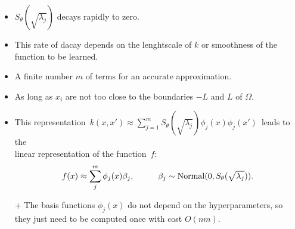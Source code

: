 \documentclass[8pt]{beamer} %
\DeclareMathOperator{\Normal}{Normal}
\begin{document}
\begin{frame}[t]
\begin{itemize}\setlength\itemsep{1mm}
\item<6-> $S_{\theta}(\sqrt{\lambda_j})$ decays rapidly to zero.
\item<6-> This rate of dacay depends on the lenghtscale of $k$ or smoothness of the function to be learned.
\item<6-> A finite number $m$ of terms for an accurate approximation.
\item<6-> As long as $x_i$ are not too close to the boundaries $-L$ and $L$ of $\Omega$.
\end{itemize}
\end{frame}

\begin{frame}[t]

\begin{itemize}\setlength\itemsep{2mm}

\item This representation\, $k(x,x') \approx \sum_{j=1}^m S_{\theta}(\sqrt{\lambda_j}) \phi_j(x) \phi_j(x')$\, leads to the\\ {\color{navyblue} linear representation} of the function\, $f$:
%
\begin{align*}
f(x) \approx \sum_{j}^m \phi_j(x) \beta_j, \hspace{10mm} \beta_j \sim \Normal(0,S_{\theta}(\sqrt{\lambda_j})).
\end{align*}
\end{itemize}



\begin{tcolorbox}[colframe=blue!20, colback=white, title=\small Properties of the method, colbacktitle=lightblue, coltitle=black, boxrule=0.5pt]
\begin{itemize}\setlength\itemsep{1.5mm}
\item[+] The basis functions $\phi_j(x)$ do not depend on the hyperparameters, so they just need to be computed once with cost $O(nm)$.


\end{itemize}
\end{tcolorbox}
\end{frame}
\end{document}
